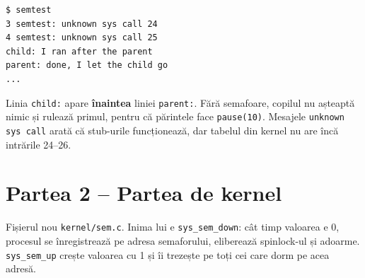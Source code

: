 \documentclass[11pt,a4paper]{article}
\begin{document}
\begin{terminal}
\begin{verbatim}
$ semtest
3 semtest: unknown sys call 24
4 semtest: unknown sys call 25
child: I ran after the parent
parent: done, I let the child go
...
\end{verbatim}
\end{terminal}
Linia \texttt{child:} apare \textbf{înaintea} liniei \texttt{parent:}. Fără semafoare, copilul nu așteaptă nimic și rulează
primul, pentru că părintele face \texttt{pause(10)}. Mesajele \texttt{unknown sys call} arată că stub-urile funcționează,
dar tabelul din kernel nu are încă intrările 24--26.

\section{Partea 2 -- Partea de kernel}
Fișierul nou \texttt{kernel/sem.c}. Inima lui e \texttt{sys\_sem\_down}: cât timp valoarea e 0, procesul se înregistrează
pe adresa semaforului, eliberează spinlock-ul și adoarme. \texttt{sys\_sem\_up} crește valoarea cu 1 și îi trezește pe toți
cei care dorm pe acea adresă.
\end{document}
